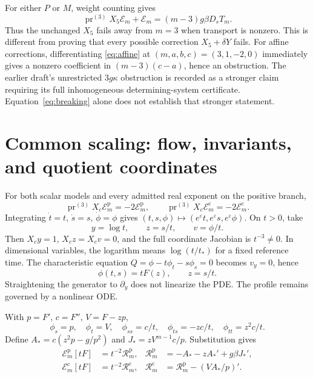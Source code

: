 \documentclass[11pt,a4paper,oneside]{report}
\numberwithin{equation}{chapter}
\newcommand{\E}{\mathcal E}
\newcommand{\R}{\mathcal R}
\newcommand{\pr}{\operatorname{pr}}
\begin{document}
For either $P$ or $M$, weight counting gives
\begin{equation}\label{eq:breaking}
\pr^{(3)}X_5\E_m+\E_m=(m-3)g\beta D_sT_m.
\end{equation}
Thus the unchanged $X_5$ fails away from $m=3$ when transport is nonzero. This is different from proving that every possible correction $X_5+\delta Y$ fails. For affine corrections, differentiating \eqref{eq:affine} at $(m,a,b,c)=(3,1,-2,0)$ immediately gives a nonzero coefficient in $(m-3)(c-a)$, hence an obstruction. The earlier draft's unrestricted $3g\kappa$ obstruction is recorded as a stronger claim requiring its full inhomogeneous determining-system certificate. Equation~\eqref{eq:breaking} alone does not establish that stronger statement.

\section{Common scaling: flow, invariants, and quotient coordinates}
For both scalar models and every admitted real exponent on the positive branch,
\begin{equation}\label{eq:commonidentity}
\pr^{(3)}X_c\E_m^{\mathrm p}=-2\E_m^{\mathrm p},\qquad
\pr^{(3)}X_c\E_m^{\mathrm c}=-2\E_m^{\mathrm c}.
\end{equation}
Integrating $\dot t=t$, $\dot s=s$, $\dot\phi=\phi$ gives
$(t,s,\phi)\mapsto(e^\varepsilon t,e^\varepsilon s,e^\varepsilon\phi)$.
On $t>0$, take
\begin{equation}\label{eq:chart}
y=\log t,\qquad z=s/t,\qquad v=\phi/t.
\end{equation}
Then $X_cy=1$, $X_cz=X_cv=0$, and the full coordinate Jacobian is $t^{-3}\ne0$. In dimensional variables, the logarithm means $\log(t/t_*)$ for a fixed reference time. The characteristic equation
$Q=\phi-t\phi_t-s\phi_s=0$ becomes $v_y=0$, hence
\begin{equation}\label{eq:ansatz}
\phi(t,s)=tF(z),\qquad z=s/t.
\end{equation}
Straightening the generator to $\partial_y$ does not linearize the PDE. The profile remains governed by a nonlinear ODE.

With $p=F'$, $c=F''$, $V=F-zp$,
\begin{equation}
\phi_s=p,\quad\phi_t=V,\quad
\phi_{ss}=c/t,\quad\phi_{ts}=-zc/t,\quad\phi_{tt}=z^2c/t.
\end{equation}
Define $A_*=c(z^2p-g/p^2)$ and $J_*=zV^{m-1}c/p$. Substitution gives
\begin{align}
\E_m^{\mathrm p}[tF]&=t^{-2}\R_m^{\mathrm p},&
\R_m^{\mathrm p}&=-A_*-zA_*'+g\beta J_*',\\
\E_m^{\mathrm c}[tF]&=t^{-2}\R_m^{\mathrm c},&
\R_m^{\mathrm c}&=\R_m^{\mathrm p}-(VA_*/p)'.
\end{align}
\end{document}
